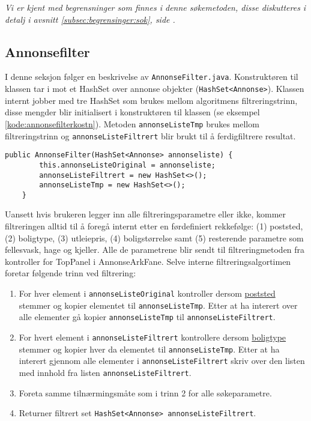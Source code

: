 \emph{Vi er kjent med begrensninger som finnes i denne søkemetoden, disse diskutteres i detalj i avsnitt \ref{subsec:begrensinger:sok}, side \pageref{subsec:begrensinger:sok}.}

\subsection{Annonsefilter} \label{sec:annonsesok}
I denne seksjon følger en beskrivelse av \texttt{AnnonseFilter.java}. Konstruktøren til klassen tar i mot et HashSet over annonse objekter (\texttt{HashSet<Annonse>}). Klassen internt jobber med tre HashSet som brukes mellom algoritmens filtreringstrinn, disse mengder blir initialisert i konstruktøren til klassen (se eksempel \ref{kode:annonsefilterkostn}). Metoden \texttt{annonseListeTmp} brukes mellom filtreringstrinn og \texttt{annonseListeFiltrert} blir brukt til å ferdigfiltrere resultat.

\begin{lstlisting}[caption=AnnonseFilter.java: Konstruktør, label=kode:annonsefilterkostn]
    public AnnonseFilter(HashSet<Annonse> annonseliste) {
        this.annonseListeOriginal = annonseliste;
        annonseListeFiltrert = new HashSet<>();
        annonseListeTmp = new HashSet<>();
    }
\end{lstlisting}

Uansett hvis brukeren legger inn alle filtreringsparametre eller ikke, kommer filtreringen alltid til å foregå internt etter en førdefiniert rekkefølge: (1) poststed, (2) boligtype, (3) utleiepris, (4) boligstørrelse samt (5) resterende parametre som fellesvask, hage og kjeller. 
Alle de parametrene blir sendt til filtreringmetoden fra kontroller for TopPanel i AnnonseArkFane. 
Selve interne filtreringsalgortimen foretar følgende trinn ved filtrering:
\begin{enumerate}
\item For hver element i \texttt{annonseListeOriginal} kontroller dersom \underline{poststed} stemmer og kopier elementet til \texttt{annonseListeTmp}. Etter at ha interert over alle elementer gå kopier \texttt{annonseListeTmp} til \texttt{annonseListeFiltrert}. 
\item For hvert element i \texttt{annonseListeFiltrert} kontrollere dersom \underline{boligtype} stemmer og kopier hver da elementet til \texttt{annonseListeTmp}. Etter at ha interert gjennom alle elementer i \texttt{annonseListeFiltrert} skriv over den listen med innhold fra listen \texttt{annonseListeFiltrert}. 
\item Foreta samme tilnærmingsmåte som i trinn 2 for alle søkeparametre. 
\item Returner filtrert set \texttt{HashSet<Annonse> annonseListeFiltrert}.
\end{enumerate}

